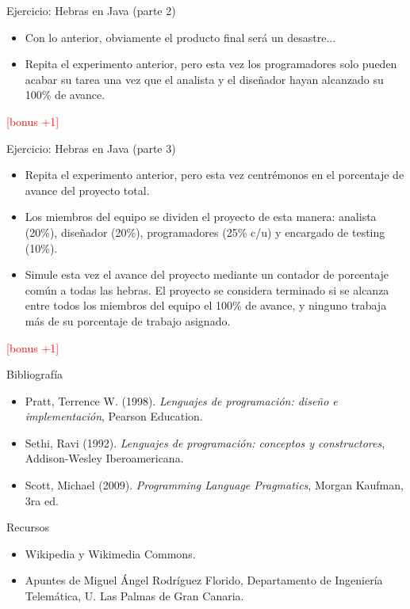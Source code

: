 \documentclass[handout]{beamer} %
\newcommand{\red}[1]{\textcolor{red}{#1}}
\begin{document}
\begin{frame}{Ejercicio: Hebras en Java (parte 2)}
    \begin{itemize}
        \item Con lo anterior, obviamente el producto final será un desastre...
        \item Repita el experimento anterior, pero esta vez los programadores solo pueden acabar su tarea una vez que el analista y el diseñador hayan alcanzado su 100\% de avance.
    \end{itemize}
    \begin{flushright}
        \red{[bonus +1]}
    \end{flushright}
\end{frame}

\begin{frame}{Ejercicio: Hebras en Java (parte 3)}
    \begin{itemize}
        \item Repita el experimento anterior, pero esta vez centrémonos en el porcentaje de avance del proyecto total.
        \item Los miembros del equipo se dividen el proyecto de esta manera:
        analista (20\%), diseñador (20\%), programadores (25\% c/u) y encargado de testing (10\%).
        \item Simule esta vez el avance del proyecto mediante un contador de porcentaje común a todas las hebras. El proyecto se considera terminado si se alcanza entre todos los miembros del equipo el 100\% de avance, y ninguno trabaja más de su porcentaje de trabajo asignado.
    \end{itemize}
    \begin{flushright}
        \red{[bonus +1]}
    \end{flushright}
\end{frame}


\begin{frame}
 \begin{block}{Bibliografía}
  \begin{itemize}
    \item Pratt, Terrence W. (1998). \textit{Lenguajes de programación: diseño e implementación}, Pearson Education.
    \item Sethi, Ravi (1992). \textit{Lenguajes de programación: conceptos y constructores}, Addison-Wesley Iberoamericana.
    \item Scott, Michael (2009). \textit{Programming Language Pragmatics}, Morgan Kaufman, 3ra ed.
  \end{itemize}
 \end{block}
 \begin{block}{Recursos}
  \begin{itemize}
    \item Wikipedia y Wikimedia Commons.
    \item Apuntes de Miguel Ángel Rodríguez Florido, Departamento de Ingeniería Telemática, U. Las Palmas de Gran Canaria.
  \end{itemize}
 \end{block}
\end{frame}
\end{document}
